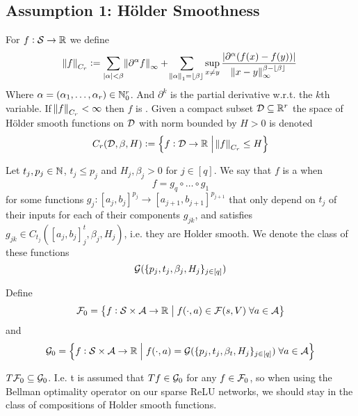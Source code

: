 
\subsection{Assumption 1: Hölder Smoothness} %

\begin{defn}
  For $f : \mathcal{S} \to \mathbb{R}$ we define
  \begin{equation}
    \norm{f}_{C_r} \vcentcolon= 
    \sum_{|{\alpha}| < \beta}
    \norm{\partial^{\alpha}f}_\infty +
    \sum_{\norm{{\alpha}}_1 = \lfloor\beta\rfloor}
    \sup_{x \neq y} \frac{|\partial^\alpha (f(x) - f(y))|}
  {\norm{x-y}_\infty^{\beta-\lfloor\beta\rfloor}}
  \end{equation}
  Where $\alpha = (\alpha_1, \dots, \alpha_r) \in \mathbb{N}_0^r$.
  And $\partial^k$ is the partial derivative w.r.t. the $k$th variable.
  If $\norm{f}_{C_r} < \infty$ then $f$ is .
  Given a compact subset $\mathcal{D} \subseteq \mathbb{R}^r$
  the space of Hölder smooth functions on $\mathcal{D}$ with norm bounded by
  $H > 0$ is denoted
  \[ C_r(\mathcal{D}, \beta, H) \vcentcolon=
  \left\{ f : \mathcal{D} \to \mathbb{R} \;\middle\vert\; \norm{f}_{C_r} \leq H \right\} \]
\end{defn}

\begin{defn}
  Let $t_j, p_j \in \mathbb{N}$, $t_j\leq p_j$ and $H_j, \beta_j > 0$ for $j \in [q]$.
  We say that $f$ is a  when
  \[ f = g_q \circ \dots \circ g_1 \]
  for some functions $g_j : [a_j, b_j]^{p_j} \to [a_{j+1}, b_{j+1}]^{p_{j+1}}$
  that only depend on $t_j$ of their inputs
  for each of their components $g_{jk}$,
  and satisfies $g_{jk} \in C_{t_j}([a_j, b_j]^t_j, \beta_j, H_j)$, 
  i.e. they are Holder smooth.
  We denote the class of these functions
  \[ \mathcal{G}(\{p_j, t_j, \beta_j, H_j\}_{j \in [q]}) \]
\end{defn}

\begin{defn}
  Define
  \[ \mathcal{F}_0 = \left\{ f : \mathcal{S} \times \mathcal{A} \to \mathbb{R} \;\middle\vert\;
  f(\cdot, a) \in \mathcal{F}(s, V) \; \forall a \in \mathcal{A} \right\} \]
  and
  \[ \mathcal{G}_0 = \left\{ f : \mathcal{S} \times \mathcal{A} \to \mathbb{R}
      \;\middle\vert\; f(\cdot, a) = \mathcal{G}(\{p_j, t_j, \beta_t, H_j\}_{j \in [q]})
  \; \forall a \in \mathcal{A} \right\} \]
\end{defn}

\begin{asm}\label{asm:A1}
  $ T \mathcal{F}_0 \subseteq \mathcal{G}_0$.
  I.e. t is assumed that $T f \in \mathcal{G}_0$ for any $f \in \mathcal{F}_0$, 
  so when using the Bellman optimality operator on our sparse ReLU networks,
  we should stay in the class of compositions of Holder smooth functions.
\end{asm}

